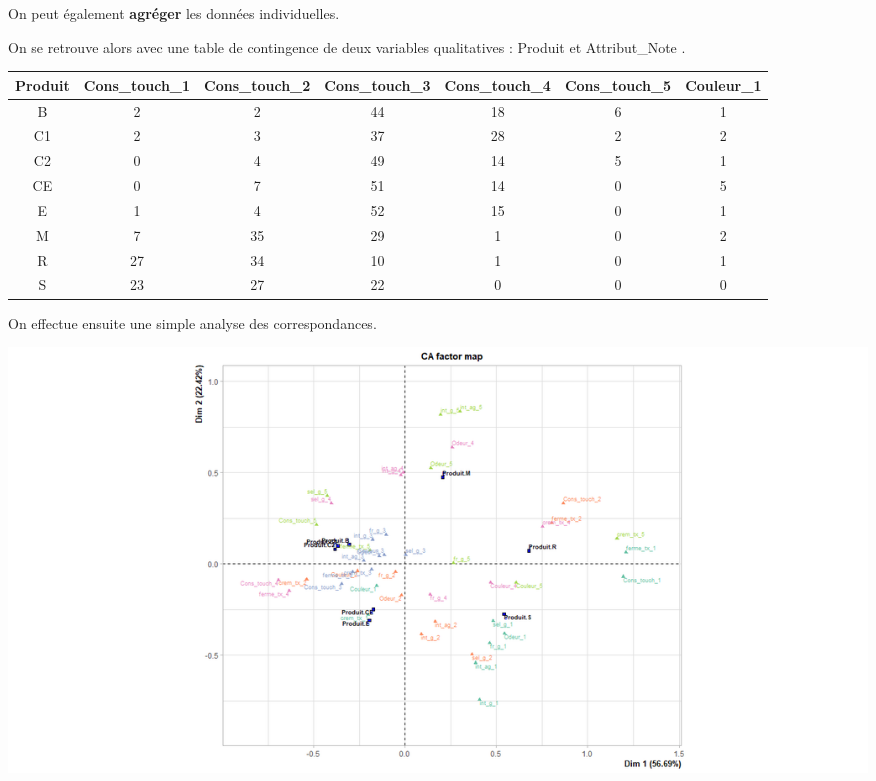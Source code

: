 \documentclass[aspectratio=169,xcolor=dvipsnames]{beamer}
\begin{document}
\begin{frame}

\textcolor{nyubluedarker}{\faCogs} On peut également \textbf{agréger} les données individuelles.

\medskip

\textcolor{nyubluedarker}{\faCogs} On se retrouve alors avec une table de contingence de deux variables qualitatives : \og Produit \fg{} et \og Attribut\_Note \fg{}.

	\begin{scriptsize}
	\begin{center}
\begin{tabular}{ccccccc}
  \hline
Produit & Cons\_touch\_1 & Cons\_touch\_2 & Cons\_touch\_3 & Cons\_touch\_4 & Cons\_touch\_5 & Couleur\_1 \\ 
  \hline
B &   2 &   2 &  44 &  18 &   6 &   1 \\ 
C1 &   2 &   3 &  37 &  28 &   2 &   2 \\ 
C2 &   0 &   4 &  49 &  14 &   5 &   1 \\ 
CE &   0 &   7 &  51 &  14 &   0 &   5 \\ 
E &   1 &   4 &  52 &  15 &   0 &   1 \\ 
M &   7 &  35 &  29 &   1 &   0 &   2 \\ 
R &  27 &  34 &  10 &   1 &   0 &   1 \\ 
S &  23 &  27 &  22 &   0 &   0 &   0 \\ 
   \hline
\end{tabular}
	\end{center}
	\end{scriptsize}

\end{frame}

\begin{frame}

\textcolor{nyubluedarker}{\faCogs} On effectue ensuite une simple analyse des correspondances.

	
	\begin{center}
	\includegraphics[scale=0.3]{ca_agg.png}
	\end{center}
	

\end{frame}
\end{document}
